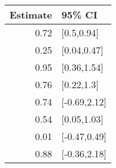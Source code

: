 \begin{tabular}{rl}
  \hline
Estimate & 95\% CI \\ 
  \hline
0.72 & [0.5,0.94] \\ 
  0.25 & [0.04,0.47] \\ 
  0.95 & [0.36,1.54] \\ 
  0.76 & [0.22,1.3] \\ 
  0.74 & [-0.69,2.12] \\ 
  0.54 & [0.05,1.03] \\ 
  0.01 & [-0.47,0.49] \\ 
  0.88 & [-0.36,2.18] \\ 
   \hline
\end{tabular}

